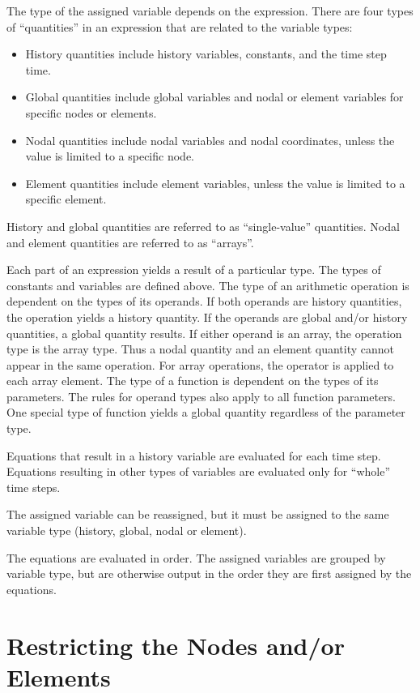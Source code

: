The type of the assigned variable depends on the expression. There are
four types of ``quantities'' in an expression that are related to the
variable types:
\setlength{\itemsep}{\medskipamount} \begin{itemize}
\item
History quantities include history variables, constants, and the time
step time.
\item
Global quantities include global variables and nodal or element
variables for specific nodes or elements.
\item
Nodal quantities include nodal variables and nodal coordinates, unless
the value is limited to a specific node.
\item
Element quantities include element variables, unless the value is
limited to a specific element.
\end{itemize}
History and global quantities are referred to as ``single-value''
quantities. Nodal and element quantities are referred to as ``arrays''.

Each part of an expression yields a result of a particular type. The
types of constants and variables are defined above. The type of an
arithmetic operation is dependent on the types of its operands. If both
operands are history quantities, the operation yields a history
quantity. If the operands are global and/or history quantities, a global
quantity results. If either operand is an array, the operation type is
the array type. Thus a nodal quantity and an element quantity cannot
appear in the same operation. For array operations, the operator is
applied to each array element. The type of a function is dependent on
the types of its parameters. The rules for operand types also apply to
all function parameters. One special type of function yields a global
quantity regardless of the parameter type.

Equations that result in a history variable are evaluated for each time
step. Equations resulting in other types of variables are evaluated only
for ``whole'' time steps.

The assigned variable can be reassigned, but it must be assigned to the
same variable type (history, global, nodal or element).

The equations are evaluated in order. The assigned variables are grouped
by variable type, but are otherwise output in the order they are first
assigned by the equations.

\section{Restricting the Nodes and/or Elements}

